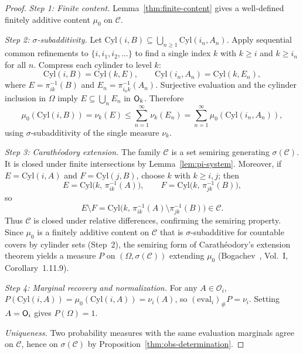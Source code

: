 \begin{proof}
\textit{Step 1: Finite content.}
Lemma~\ref{thm:finite-content} gives a well-defined finitely additive content $\mu_0$ on $\mathcal{C}$.

\textit{Step 2: $\sigma$-subadditivity.}
Let $\mathrm{Cyl}(i, B) \subseteq \bigcup_{n \geq 1} \mathrm{Cyl}(i_n, A_n)$. Apply sequential common refinements to $\{i, i_1, i_2, \ldots\}$ to find a single index $k$ with $k \geq i$ and $k \geq i_n$ for all $n$.  Compress each cylinder to level $k$:
\[
  \mathrm{Cyl}(i, B) = \mathrm{Cyl}(k, E),
  \qquad
  \mathrm{Cyl}(i_n, A_n) = \mathrm{Cyl}(k, E_n),
\]
where $E = \pi_{ik}^{-1}(B)$ and $E_n = \pi_{i_n k}^{-1}(A_n)$. Surjective evaluation and the cylinder inclusion in $\Omega$ imply $E \subseteq
\bigcup_n E_n$ in $\mathsf{O}_{k}$.  Therefore
\[
  \mu_0(\mathrm{Cyl}(i, B))
  = \nu_k(E)
  \leq \sum_{n=1}^\infty \nu_k(E_n)
  = \sum_{n=1}^\infty \mu_0(\mathrm{Cyl}(i_n, A_n)),
\]
using $\sigma$-subadditivity of the single measure $\nu_k$.

\textit{Step 3: Carathéodory extension.}
The family $\mathcal{C}$ is a set semiring generating $\sigma(\mathcal{C})$. It is closed under finite intersections by Lemma~\ref{lem:pi-system}. Moreover, if $E = \mathrm{Cyl}(i, A)$ and $F = \mathrm{Cyl}(j, B)$, choose $k$ with $k \geq i, j$; then
\[
  E = \mathrm{Cyl}\!\bigl(k,\, \pi_{ik}^{-1}(A)\bigr),
  \qquad
  F = \mathrm{Cyl}\!\bigl(k,\, \pi_{jk}^{-1}(B)\bigr),
\]
so
\[
  E \setminus F = \mathrm{Cyl}\!\bigl(k,\, \pi_{ik}^{-1}(A) \setminus \pi_{jk}^{-1}(B)\bigr)
  \in \mathcal{C}.
\]
Thus $\mathcal{C}$ is closed under relative differences, confirming the semiring property. Since $\mu_0$ is a finitely additive content on $\mathcal{C}$ that is $\sigma$-subadditive for countable covers by cylinder sets (Step~2), the semiring form of Carathéodory's extension theorem yields a measure $P$ on $(\Omega, \sigma(\mathcal{C}))$ extending $\mu_0$ (Bogachev~\cite{Bogachev}, Vol.~I, Corollary~1.11.9).

\textit{Step 4: Marginal recovery and normalization.}
For any $A \in \mathcal{O}_i$, $P(\mathrm{Cyl}(i, A)) = \mu_0(\mathrm{Cyl}(i, A)) = \nu_i(A)$, so $(\mathrm{eval}_i)_\# P = \nu_i$.  Setting $A = \mathsf{O}_{i}$ gives $P(\Omega) = 1$.

\textit{Uniqueness.}
Two probability measures with the same evaluation marginals agree on $\mathcal{C}$, hence on $\sigma(\mathcal{C})$ by Proposition~\ref{thm:obs-determination}.
\end{proof}

